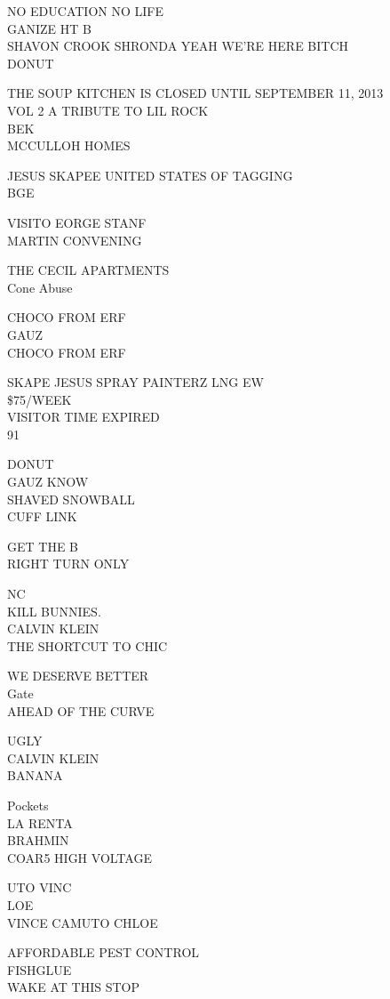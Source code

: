 \documentclass[10pt,letterpaper]{article}
\begin{document}
NO EDUCATION NO LIFE\\
GANIZE HT B\\
SHAVON CROOK SHRONDA YEAH WE'RE HERE BITCH\\
DONUT

THE SOUP KITCHEN IS CLOSED UNTIL SEPTEMBER 11, 2013\\
VOL 2 A TRIBUTE TO LIL ROCK\\
BEK\\
MCCULLOH HOMES

JESUS SKAPEE UNITED STATES OF TAGGING\\
BGE

VISITO EORGE STANF\\
MARTIN CONVENING

THE CECIL APARTMENTS\\
Cone Abuse

CHOCO FROM ERF\\
GAUZ\\
CHOCO FROM ERF

SKAPE JESUS SPRAY PAINTERZ LNG EW\\
\$75/WEEK\\
VISITOR TIME EXPIRED\\
91

DONUT\\
GAUZ KNOW\\
SHAVED SNOWBALL\\
CUFF LINK

GET THE B\\
RIGHT TURN ONLY

NC\\
KILL BUNNIES.\\
CALVIN KLEIN\\
THE SHORTCUT TO CHIC

WE DESERVE BETTER\\
Gate\\
AHEAD OF THE CURVE

UGLY\\
CALVIN KLEIN\\
BANANA

Pockets\\
LA RENTA\\
BRAHMIN\\
COAR5 HIGH VOLTAGE

UTO VINC\\
LOE\\
VINCE CAMUTO CHLOE

AFFORDABLE PEST CONTROL\\
FISHGLUE\\
WAKE AT THIS STOP
\end{document}

